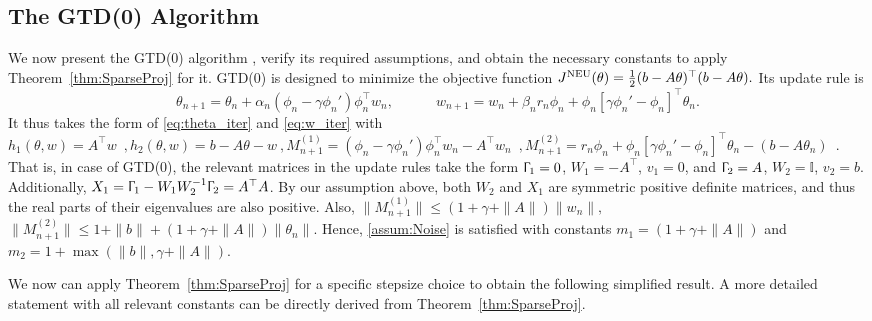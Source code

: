 \documentclass[usenames,dvipsnames,final,12pt]{colt2018} %
\newcommand{\bE}{\mathbb{E}}
\newcommand{\Xt}{X_1}
\newcommand{\Wt}{W_1}
\newcommand{\Tt}{\Upgamma_1}
\newcommand{\Mt}{M^{(1)}}
\newcommand{\st}{\alpha}
\newcommand{\mt}{m_1}
\newcommand{\Tw}{\Upgamma_2}
\newcommand{\Ww}{W_2}
\newcommand{\Mw}{M^{(2)}}
\newcommand{\sw}{\beta}
\newcommand{\mw}{m_2}
\newcommand{\Id}{\mathbb{I}}
\newcommand{\gal}[1]{#1}
\newcommand{\gugan}[1]{#1}
\begin{document}
\subsection{\gal{The GTD(0) Algorithm}}
\label{sec: GTD0}
We now present the GTD(0) algorithm \citep{sutton2009convergent}, verify its required assumptions, and obtain the necessary constants to apply Theorem~\ref{thm:SparseProj} for it. \gal{ GTD(0) is designed to minimize the objective function %
$
J^{\rm NEU}(\theta)
=
\tfrac{1}{2}(b-A\theta)^\top (b-A\theta).
$
Its update rule is}
\begin{equation*}
\label{eq:GTD0 iter}
\theta_{n + 1} = \theta_n + \st_n \left(\phi_n - \gamma \phi_n'\right)\phi_n^\top w_n, \quad\quad\quad
w_{n + 1} = w_n + \sw_n r_n\phi_n + \phi_n[\gamma\phi_n'-\phi_n]^\top\theta_n .
\end{equation*}
\gal{It thus takes the form of} \eqref{eq:theta_iter} and \eqref{eq:w_iter} with
$h_1(\theta,w) = %
A^\top w \enspace,
h_2(\theta,w) = %
b-A\theta - w ~,
\Mt_{n+1} = \left(\phi_n - \gamma \phi_n'\right)\phi_n^\top w_n - A^\top w_n \enspace, \Mw_{n+1} %
= r_n\phi_n + \phi_n[\gamma\phi_n'-\phi_n]^\top\theta_n  - \left(b-A\theta_n \right) \enspace.
$
That is, in case of GTD(0), the relevant matrices in the update rules take the form
$\Tt = 0$, $\Wt = -A^\top$, $v_1 = 0$, and $\Tw=A$, $\Ww=\Id$, $v_2=b$.
Additionally, $\Xt = \Tt - \Wt\Ww^{-1}\Tw = A^\top A$.
By our assumption above, both $\Ww$ and $\Xt$ are symmetric positive definite matrices, and thus the real parts of their eigenvalues are also positive.
%
Also,
$
\|\Mt_{n+1}\| \leq (1+\gamma+\|A\|) \|w_n\| ,
$
$
\|\Mw_{n+1}\|
\leq  1+\|b\| + (1+\gamma+\|A\|)\|\theta_n\|.
$
%
\gugan{Hence, \ref{assum:Noise} is} satisfied with constants $\mt = (1+\gamma+\|A\|)$ and $\mw = 1 + \max(\|b\|,\gamma+\|A\|)$.

We now can apply \gal{Theorem~\ref{thm:SparseProj}  for a specific stepsize choice to obtain the following simplified result. A more detailed statement with all relevant constants can be directly derived from Theorem~\ref{thm:SparseProj}. }
\end{document}
